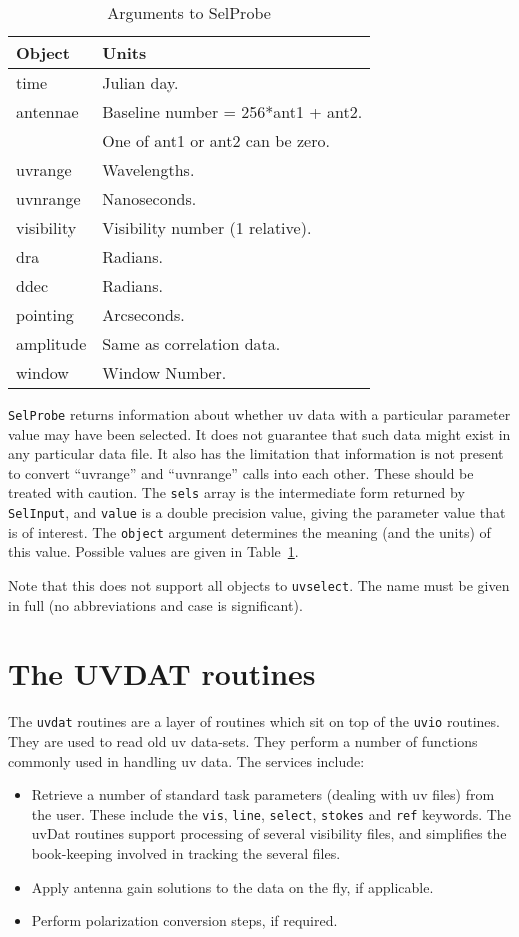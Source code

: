 \begin{table}\centering
\begin{tabular}{|l|l|}					   \hline
\bf Object	& \bf Units				\\ \hline
time		& Julian day.				\\
antennae	& Baseline number = 256*ant1 + ant2.	\\
		& One of ant1 or ant2 can be zero.	\\
uvrange		& Wavelengths.				\\
uvnrange	& Nanoseconds.				\\
visibility	& Visibility number (1 relative).	\\
dra		& Radians.				\\
ddec		& Radians.				\\
pointing	& Arcseconds.				\\
amplitude	& Same as correlation data.		\\
window		& Window Number.			\\ \hline
\end{tabular}
\caption{Arguments to SelProbe}
\label{t:selprobe}
\end{table}

{\tt SelProbe} returns information about whether uv data with a particular
parameter value may have been selected.
It does not guarantee that such data might exist
in any particular data file. It also has the limitation that
information is not present to convert ``uvrange'' and ``uvnrange''
calls into each other. These should be treated with caution. The {\tt sels}
array is the intermediate form returned by {\tt SelInput}, and {\tt value}
is a double precision value, giving the parameter value that is of interest.
The {\tt object} argument determines the meaning (and the units) of this
value. Possible values are given in Table~\ref{t:selprobe}.

Note that this does not support all objects to {\tt uvselect}.
The name must be given in full (no abbreviations and case is significant).

\section{The UVDAT routines}
The {\tt uvdat} routines are a layer of routines which sit on top of the {\tt uvio}
routines. They are used to read old uv data-sets. They perform a number of
functions commonly used in handling uv data. The services include:
\begin{itemize}
\item Retrieve a number of standard task parameters (dealing with uv files) from the
user. These include the {\tt vis}, {\tt line}, {\tt select}, {\tt stokes} and
{\tt ref} keywords. The uvDat routines support processing of several visibility
files, and simplifies the book-keeping involved in tracking the several files.
\item Apply antenna gain solutions to the data on the fly, if applicable.
\item Perform polarization conversion steps, if required.
\end{itemize}

